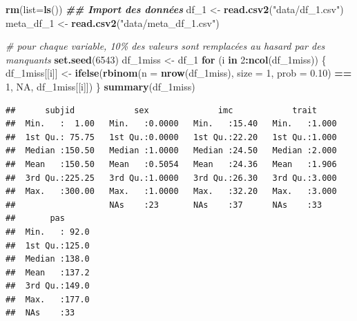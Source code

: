 \documentclass[
]{book}
\newenvironment{Shaded}{\begin{snugshade}}{\end{snugshade}}
\newcommand{\AttributeTok}[1]{\textcolor[rgb]{0.13,0.29,0.53}{#1}}
\newcommand{\CommentTok}[1]{\textcolor[rgb]{0.56,0.35,0.01}{\textit{#1}}}
\newcommand{\ConstantTok}[1]{\textcolor[rgb]{0.56,0.35,0.01}{#1}}
\newcommand{\ControlFlowTok}[1]{\textcolor[rgb]{0.13,0.29,0.53}{\textbf{#1}}}
\newcommand{\DecValTok}[1]{\textcolor[rgb]{0.00,0.00,0.81}{#1}}
\newcommand{\DocumentationTok}[1]{\textcolor[rgb]{0.56,0.35,0.01}{\textbf{\textit{#1}}}}
\newcommand{\FloatTok}[1]{\textcolor[rgb]{0.00,0.00,0.81}{#1}}
\newcommand{\FunctionTok}[1]{\textcolor[rgb]{0.13,0.29,0.53}{\textbf{#1}}}
\newcommand{\NormalTok}[1]{#1}
\newcommand{\OtherTok}[1]{\textcolor[rgb]{0.56,0.35,0.01}{#1}}
\newcommand{\SpecialCharTok}[1]{\textcolor[rgb]{0.81,0.36,0.00}{\textbf{#1}}}
\newcommand{\StringTok}[1]{\textcolor[rgb]{0.31,0.60,0.02}{#1}}
\begin{document}
\begin{Shaded}
\begin{Highlighting}[]
\FunctionTok{rm}\NormalTok{(}\AttributeTok{list=}\FunctionTok{ls}\NormalTok{())}
\DocumentationTok{\#\# Import des données}
\NormalTok{df\_1 }\OtherTok{\textless{}{-}} \FunctionTok{read.csv2}\NormalTok{(}\StringTok{"data/df\_1.csv"}\NormalTok{)}
\NormalTok{meta\_df\_1 }\OtherTok{\textless{}{-}} \FunctionTok{read.csv2}\NormalTok{(}\StringTok{"data/meta\_df\_1.csv"}\NormalTok{)}

\CommentTok{\# pour chaque variable, 10\% des valeurs sont remplacées au hasard par des manquants}
\FunctionTok{set.seed}\NormalTok{(}\DecValTok{6543}\NormalTok{)}
\NormalTok{df\_1miss }\OtherTok{\textless{}{-}}\NormalTok{ df\_1}
\ControlFlowTok{for}\NormalTok{ (i }\ControlFlowTok{in} \DecValTok{2}\SpecialCharTok{:}\FunctionTok{ncol}\NormalTok{(df\_1miss)) \{}
\NormalTok{  df\_1miss[[i]] }\OtherTok{\textless{}{-}} \FunctionTok{ifelse}\NormalTok{(}\FunctionTok{rbinom}\NormalTok{(}\AttributeTok{n =} \FunctionTok{nrow}\NormalTok{(df\_1miss), }\AttributeTok{size =} \DecValTok{1}\NormalTok{, }\AttributeTok{prob =} \FloatTok{0.10}\NormalTok{) }\SpecialCharTok{==} \DecValTok{1}\NormalTok{, }
                          \ConstantTok{NA}\NormalTok{, df\_1miss[[i]])}
\NormalTok{\}}
\FunctionTok{summary}\NormalTok{(df\_1miss)}
\end{Highlighting}
\end{Shaded}

\begin{verbatim}
##      subjid            sex              imc            trait      
##  Min.   :  1.00   Min.   :0.0000   Min.   :15.40   Min.   :1.000  
##  1st Qu.: 75.75   1st Qu.:0.0000   1st Qu.:22.20   1st Qu.:1.000  
##  Median :150.50   Median :1.0000   Median :24.50   Median :2.000  
##  Mean   :150.50   Mean   :0.5054   Mean   :24.36   Mean   :1.906  
##  3rd Qu.:225.25   3rd Qu.:1.0000   3rd Qu.:26.30   3rd Qu.:3.000  
##  Max.   :300.00   Max.   :1.0000   Max.   :32.20   Max.   :3.000  
##                   NAs    :23       NAs    :37      NAs    :33     
##       pas       
##  Min.   : 92.0  
##  1st Qu.:125.0  
##  Median :138.0  
##  Mean   :137.2  
##  3rd Qu.:149.0  
##  Max.   :177.0  
##  NAs    :33
\end{verbatim}
\end{document}
